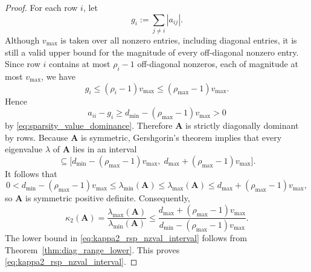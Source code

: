 \documentclass[11pt,a4paper]{article}
\theoremstyle{plain}
\theoremstyle{definition}
\theoremstyle{remark}
\begin{document}
\begin{proof}
For each row $i$, let
\begin{equation*}
g_i:=\sum_{j\neq i}|a_{ij}|.
\end{equation*}
Although $v_{\max}$ is taken over all nonzero entries, including diagonal entries, it is still a valid upper bound for the magnitude of every off-diagonal nonzero entry. Since row $i$ contains at most $\rho_i-1$ off-diagonal nonzeros, each of magnitude at most $v_{\max}$, we have
\begin{equation*}
g_i\le (\rho_i-1)v_{\max}\le (\rho_{\max}-1)v_{\max}.
\end{equation*}
Hence
\begin{equation*}
a_{ii}-g_i
\ge
d_{\min}-(\rho_{\max}-1)v_{\max}
>0
\end{equation*}
by \eqref{eq:sparsity_value_dominance}. Therefore $\mathbf{A}$ is strictly diagonally dominant by rows. Because $\mathbf{A}$ is symmetric, Gershgorin's theorem implies that every eigenvalue $\lambda$ of $\mathbf{A}$ lies in an interval
\begin{equation*}
[a_{ii}-g_i,\; a_{ii}+g_i]
\subseteq
\bigl[d_{\min}-(\rho_{\max}-1)v_{\max},\;
d_{\max}+(\rho_{\max}-1)v_{\max}\bigr].
\end{equation*}
It follows that
\begin{equation*}
0<d_{\min}-(\rho_{\max}-1)v_{\max}
\le \lambda_{\min}(\mathbf{A})
\le \lambda_{\max}(\mathbf{A})
\le d_{\max}+(\rho_{\max}-1)v_{\max},
\end{equation*}
so $\mathbf{A}$ is symmetric positive definite. Consequently,
\begin{equation*}
\kappa_2(\mathbf{A})
=
\frac{\lambda_{\max}(\mathbf{A})}{\lambda_{\min}(\mathbf{A})}
\le
\frac{d_{\max}+(\rho_{\max}-1)v_{\max}}
{d_{\min}-(\rho_{\max}-1)v_{\max}}.
\end{equation*}
The lower bound in \eqref{eq:kappa2_rsp_nzval_interval} follows from Theorem~\ref{thm:diag_range_lower}. This proves \eqref{eq:kappa2_rsp_nzval_interval}.


\end{proof}
\end{document}
